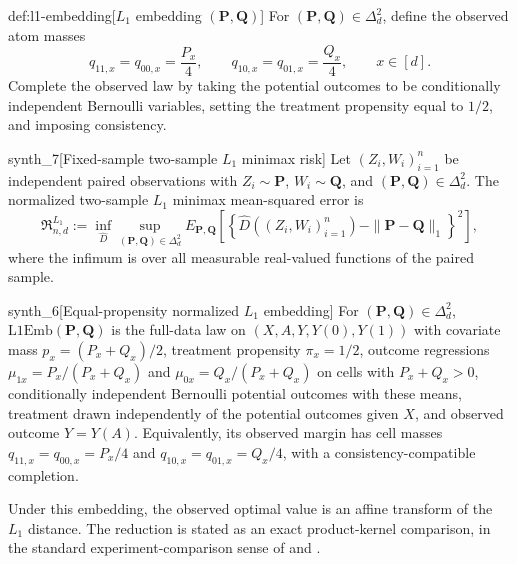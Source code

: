 \documentclass[11pt]{article}
\begin{document}
\begin{definitionv}{def:l1-embedding}[\(L_1\) embedding \((\mathbf P,\mathbf Q)\)]
For \((\mathbf P,\mathbf Q)\in\Delta_d^2\), define the observed atom masses
\[
q_{11,x}=q_{00,x}=\frac{P_x}{4},
\qquad
q_{10,x}=q_{01,x}=\frac{Q_x}{4},
\qquad x\in[d].
\]
Complete the observed law by taking the potential outcomes to be conditionally independent Bernoulli variables, setting the treatment propensity equal to \(1/2\), and imposing consistency.
\end{definitionv}

\begin{definitionv}{synth_7}[Fixed-sample two-sample \(L_1\) minimax risk]
Let \((Z_i,W_i)_{i=1}^n\) be independent paired observations with \(Z_i\sim\mathbf P\), \(W_i\sim\mathbf Q\), and \((\mathbf P,\mathbf Q)\in\Delta_d^2\). The normalized two-sample \(L_1\) minimax mean-squared error is \[ \mathfrak R^{L_1}_{n,d}:=\inf_{\widehat D}\sup_{(\mathbf P,\mathbf Q)\in\Delta_d^2}E_{\mathbf P,\mathbf Q}\left[\left\{\widehat D((Z_i,W_i)_{i=1}^n)-\|\mathbf P-\mathbf Q\|_1\right\}^2\right], \] where the infimum is over all measurable real-valued functions of the paired sample.
\end{definitionv}

\begin{definitionv}{synth_6}[Equal-propensity normalized \(L_1\) embedding]
For \((\mathbf P,\mathbf Q)\in\Delta_d^2\), \(\mathrm{L1Emb}(\mathbf P,\mathbf Q)\) is the full-data law on \((X,A,Y,Y(0),Y(1))\) with covariate mass \(p_x=(P_x+Q_x)/2\), treatment propensity \(\pi_x=1/2\), outcome regressions \(\mu_{1x}=P_x/(P_x+Q_x)\) and \(\mu_{0x}=Q_x/(P_x+Q_x)\) on cells with \(P_x+Q_x>0\), conditionally independent Bernoulli potential outcomes with these means, treatment drawn independently of the potential outcomes given \(X\), and observed outcome \(Y=Y(A)\). Equivalently, its observed margin has cell masses \(q_{11,x}=q_{00,x}=P_x/4\) and \(q_{10,x}=q_{01,x}=Q_x/4\), with a consistency-compatible completion.
\end{definitionv}

Under this embedding, the observed optimal value is an affine transform of the \(L_1\) distance. The reduction is stated as an exact product-kernel comparison, in the standard experiment-comparison sense of \citet{LeCam1986} and \citet{Tsybakov2009}.
\end{document}
